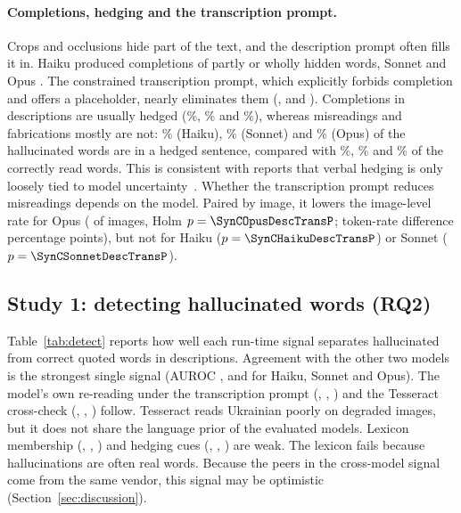 \paragraph{Completions, hedging and the transcription prompt.}\label{sec:completion} Crops and occlusions hide part of the text, and the description prompt often fills it in. Haiku produced \NComplHaiku{} completions of partly or wholly hidden words, Sonnet \NComplSonnet{} and Opus \NComplOpus{}. The constrained transcription prompt, which explicitly forbids completion and offers a placeholder, nearly eliminates them (\NComplTransHaiku, \NComplTransSonnet{} and \NComplTransOpus). Completions in descriptions are usually hedged (\ComplHedgedHaiku\%, \ComplHedgedSonnet\% and \ComplHedgedOpus\%), whereas misreadings and fabrications mostly are not: \HedgeHallHaiku\% (Haiku), \HedgeHallSonnet\% (Sonnet) and \HedgeHallOpus\% (Opus) of the hallucinated words are in a hedged sentence, compared with \HedgeCorrHaiku\%, \HedgeCorrSonnet\% and \HedgeCorrOpus\% of the correctly read words. This is consistent with reports that verbal hedging is only loosely tied to model uncertainty~\cite{yona2024can}. Whether the transcription prompt reduces misreadings depends on the model. Paired by image, it lowers the image-level rate for Opus (\SynCOpusDescTransImg{} of images, Holm $p=\SynCOpusDescTransP$; token-rate difference \SynCOpusDescTransTok{} percentage points), but not for Haiku ($p=\SynCHaikuDescTransP$) or Sonnet ($p=\SynCSonnetDescTransP$).

\subsection{Study 1: detecting hallucinated words (RQ2)}\label{sec:rq2}

Table~\ref{tab:detect} reports how well each run-time signal separates hallucinated from correct quoted words in descriptions. Agreement with the other two models is the strongest single signal (AUROC \AucXmodelHaiku, \AucXmodelSonnet{} and \AucXmodelOpus{} for Haiku, Sonnet and Opus). The model's own re-reading under the transcription prompt (\AucRereadHaiku, \AucRereadSonnet, \AucRereadOpus) and the Tesseract cross-check (\AucOcrHaiku, \AucOcrSonnet, \AucOcrOpus) follow. Tesseract reads Ukrainian poorly on degraded images, but it does not share the language prior of the evaluated models. Lexicon membership (\AucLexHaiku, \AucLexSonnet, \AucLexOpus) and hedging cues (\AucHedgeHaiku, \AucHedgeSonnet, \AucHedgeOpus) are weak. The lexicon fails because hallucinations are often real words. Because the peers in the cross-model signal come from the same vendor, this signal may be optimistic (Section~\ref{sec:discussion}).

